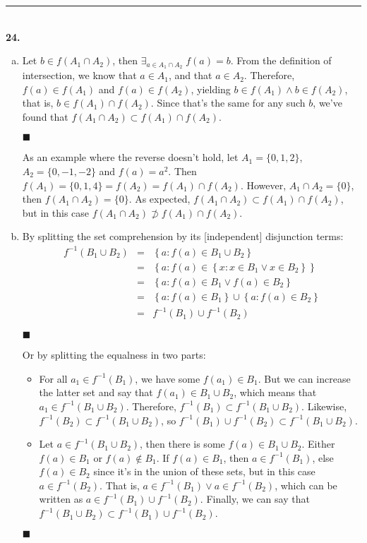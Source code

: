 \documentclass{article}[10pt]
\newenvironment{exercise}[1]
    {\noindent\rule{2cm}{0.4pt} \\
     \textbf{#1.}}
    {}
\newcommand{\qed}{

\hfill\ensuremath{\blacksquare}

}
\begin{document}
\begin{exercise}{24}
\begin{enumerate}[(a)]
    \item
      Let $b \in f(A_1 \cap A_2)$,
      then $\exists_{a \in A_1 \cap A_2} \; f(a) = b$.
      From the definition of intersection,
      we know that $a \in A_1$, and that $a \in A_2$.
      Therefore, $f(a) \in f(A_1)$ and $f(a) \in f(A_2)$,
      yielding $b \in f(A_1) \land b \in f(A_2)$,
      that is, $b \in f(A_1) \cap f(A_2)$.
      Since that's the same for any such $b$,
      we've found that $f(A_1 \cap A_2) \subset f(A_1) \cap f(A_2)$.
      \qed
      As an example where the reverse doesn't hold,
      let $A_1 = \{0, 1, 2\}$, $A_2 = \{0, -1, -2\}$
      and $f(a) = a^2$.
      Then $f(A_1) = \{0, 1, 4\} = f(A_2) = f(A_1) \cap f(A_2)$.
      However, $A_1 \cap A_2 = \{0\}$, then $f(A_1 \cap A_2) = \{0\}$.
      As expected, $f(A_1 \cap A_2) \subset f(A_1) \cap f(A_2)$,
      but in this case
      $f(A_1 \cap A_2) \not\supset f(A_1) \cap f(A_2)$.

    \item
      By splitting the set comprehension
      by its [independent] disjunction terms:
      \[\begin{array}{rcl}
        f^{-1}(B_1 \cup B_2)
        &=& \left\{ a : f(a) \in B_1 \cup B_2 \right\} \\
        &=& \left\{ a : f(a) \in \left\{ x : x \in B_1 \lor x \in B_2
                                 \right\}
            \right\} \\
        &=& \left\{ a : f(a) \in B_1 \lor f(a) \in B_2 \right\} \\
        &=& \left\{ a : f(a) \in B_1 \right\} \cup
            \left\{ a : f(a) \in B_2 \right\} \\
        &=& f^{-1}(B_1) \cup f^{-1}(B_2)
      \end{array}\]
      \qed
      Or by splitting the equalness in two parts:
      \begin{itemize}
        \item
          For all $a_1 \in f^{-1}(B_1)$,
          we have some $f(a_1) \in B_1$.
          But we can increase the latter set
          and say that $f(a_1) \in B_1 \cup B_2$,
          which means that $a_1 \in f^{-1}(B_1 \cup B_2)$.
          Therefore, $f^{-1}(B_1) \subset f^{-1}(B_1 \cup B_2)$.
          Likewise, $f^{-1}(B_2) \subset f^{-1}(B_1 \cup B_2)$, so
          $f^{-1}(B_1) \cup f^{-1}(B_2) \subset f^{-1}(B_1 \cup B_2)$.
        \item
          Let $a \in f^{-1}(B_1 \cup B_2)$,
          then there is some $f(a) \in B_1 \cup B_2$.
          Either $f(a) \in B_1$ or $f(a) \notin B_1$.
          If $f(a) \in B_1$, then $a \in f^{-1}(B_1)$,
          else $f(a) \in B_2$ since it's in the union of these sets,
          but in this case $a \in f^{-1}(B_2)$.
          That is, $a \in f^{-1}(B_1) \lor a \in f^{-1}(B_2)$,
          which can be written as $a \in f^{-1}(B_1) \cup f^{-1}(B_2)$.
          Finally, we can say that
          $f^{-1}(B_1 \cup B_2) \subset f^{-1}(B_1) \cup f^{-1}(B_2)$.
      \end{itemize}
      \qed


\end{enumerate}
\end{exercise}
\end{document}
